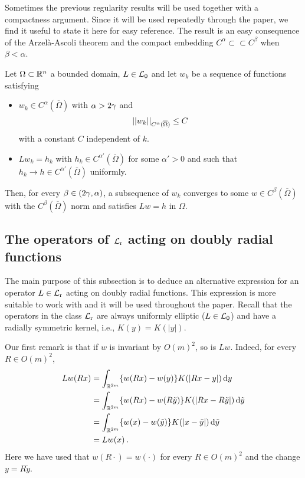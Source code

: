 Sometimes the previous regularity results will be used together with a compactness argument. Since
it will be used repeatedly through the paper, we find it useful to state it here for easy
reference. The result is an easy consequence of the Arzelà-Ascoli theorem and the compact embedding
$C^\alpha \subset \subset C^\beta$ when $\beta < \alpha$.

\begin{lemma}
\label{Lemma:CompactnessLemma} Let $\Omega\subset \mathbb{R}^n$ a bounded domain, $L\in \mathcal{L}_0$ and let
$w_k$ be a sequence of functions satisfying
\begin{itemize}
\item $w_k \in C^\alpha (\overline{\Omega})$ with $\alpha > 2\gamma$ and
$$
\left | \left |{w_k} \right | \right |_{C^\alpha (\overline{\Omega})} \leq C
$$
with a constant $C$ independent of $k$.
\item $L w_k = h_k$ with $h_k \in C^{\alpha'}(\overline{\Omega})$ for some $\alpha' > 0$ and such
    that $h_k \to h \in C^{\alpha'}(\overline{\Omega})$ uniformly.
\end{itemize}
Then, for every $\beta \in (2\gamma, \alpha)$, a subsequence of $w_k$ converges to some $w \in C^\beta
(\overline{\Omega})$ with the $C^\beta (\overline{\Omega})$ norm and satisfies $Lw = h$ in
$\Omega$.
\end{lemma}

\subsection{The operators of $\mathcal{L}_{\mathrm{r}}$ acting on doubly radial functions}

The main purpose of this subsection is to deduce an alternative expression for an operator $L\in \mathcal{L}_{\mathrm{r}}$ acting on doubly radial functions. This expression is more suitable to work with and it will be used throughout the paper. Recall that the operators in the class $\mathcal{L}_{\mathrm{r}}$ are always uniformly elliptic ($L\in \mathcal{L}_0$) and have a radially symmetric kernel, i.e., $K(y) = K(|y|)$.

Our first remark is that if $w$ is invariant by $O(m)^2$, so is $Lw$. Indeed, for every $R \in
O(m)^2$,
\begin{align*}
Lw (Rx)
& = \int_{\mathbb{R}^{2m}} \{w(Rx) - w(y)\} K(|Rx - y|)  \,\mathrm{d} y\\
& = \int_{\mathbb{R}^{2m}} \{w(Rx) - w(R\tilde{y})\} K(|Rx - R\tilde{y}|) \,\mathrm{d} \tilde{y}\\
& = \int_{\mathbb{R}^{2m}} \{w(x) - w(\tilde{y})\} K(|x-\tilde{y}|) \,\mathrm{d} \tilde{y}\\
& = Lw (x)\,.
\end{align*}
Here we have used that $w(R \cdot) = w(\cdot)$ for every $R\in O(m)^2$ and the change $y =
R\tilde{y}$.


